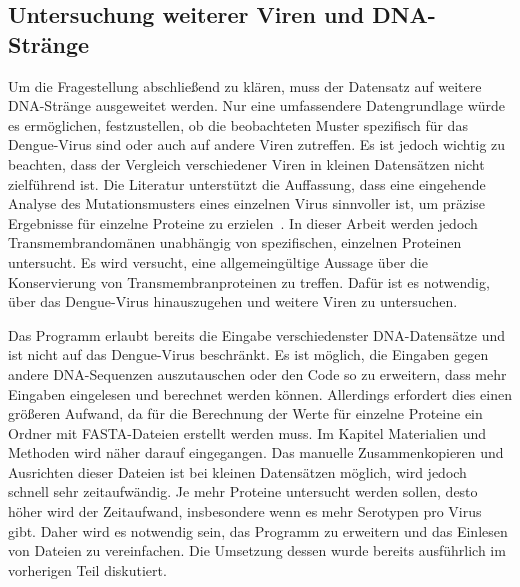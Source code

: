 \documentclass[german,version-2022-01]{uzl-thesis}
\begin{document}
\subsection{Untersuchung weiterer Viren und DNA-Str\"ange}
Um die Fragestellung abschlie\ss{}end zu kl\"aren, muss der Datensatz auf weitere DNA-Str\"ange ausgeweitet werden. Nur eine umfassendere Datengrundlage w\"urde es erm\"oglichen, festzustellen, ob die beobachteten Muster spezifisch f\"ur das Dengue-Virus sind oder auch auf andere Viren zutreffen. Es ist jedoch wichtig zu beachten, dass der Vergleich verschiedener Viren in kleinen Datens\"atzen nicht zielf\"uhrend ist. Die Literatur unterst\"utzt die Auffassung, dass eine eingehende Analyse des Mutationsmusters eines einzelnen Virus sinnvoller ist, um pr\"azise Ergebnisse f\"ur einzelne Proteine zu erzielen~\cite{nina}. In dieser Arbeit werden jedoch Transmembrandom\"anen unabh\"angig von spezifischen, einzelnen Proteinen untersucht. Es wird versucht, eine allgemeing\"ultige Aussage \"uber die Konservierung von Transmembranproteinen zu treffen. Daf\"ur ist es notwendig, \"uber das Dengue-Virus hinauszugehen und weitere Viren zu untersuchen. 

Das Programm erlaubt bereits die Eingabe verschiedenster DNA-Datens\"atze und ist nicht auf das Dengue-Virus beschr\"ankt. Es ist m\"oglich, die Eingaben gegen andere DNA-Sequenzen auszutauschen oder den Code so zu erweitern, dass mehr Eingaben eingelesen und berechnet werden k\"onnen. Allerdings erfordert dies einen gr\"o\ss{}eren Aufwand, da f\"ur die Berechnung der Werte f\"ur einzelne Proteine ein Ordner mit FASTA-Dateien erstellt werden muss. Im Kapitel Materialien und Methoden wird n\"aher darauf eingegangen. Das manuelle Zusammenkopieren und Ausrichten dieser Dateien ist bei kleinen Datens\"atzen m\"oglich, wird jedoch schnell sehr zeitaufw\"andig. Je mehr Proteine untersucht werden sollen, desto h\"oher wird der Zeitaufwand, insbesondere wenn es mehr Serotypen pro Virus gibt. Daher wird es notwendig sein, das Programm zu erweitern und das Einlesen von Dateien zu vereinfachen. Die Umsetzung dessen wurde bereits ausf\"uhrlich im vorherigen Teil diskutiert. 
\end{document}
